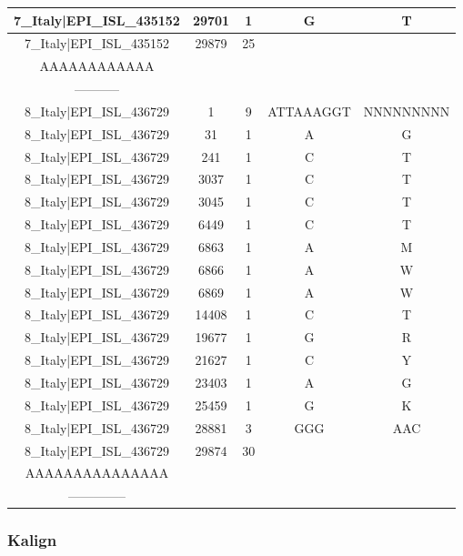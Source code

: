 \documentclass[a4paper,10pt]{article}
\begin{document}
\begin{longtable}{@{}ccccc@{}}
7\_Italy|EPI\_ISL\_435152 & 29701 & 1 & G & T \\* \midrule
7\_Italy|EPI\_ISL\_435152 & 29879 & 25 & \begin{tabular}[c]{@{}c@{}}AAAAAAAAAAAAA\\ AAAAAAAAAAAA\end{tabular} & \begin{tabular}[c]{@{}c@{}}--------------\\ -----------\end{tabular} \\* \midrule
8\_Italy|EPI\_ISL\_436729 & 1 & 9 & ATTAAAGGT & NNNNNNNNN \\* \midrule
8\_Italy|EPI\_ISL\_436729 & 31 & 1 & A & G \\* \midrule
8\_Italy|EPI\_ISL\_436729 & 241 & 1 & C & T \\* \midrule
8\_Italy|EPI\_ISL\_436729 & 3037 & 1 & C & T \\* \midrule
8\_Italy|EPI\_ISL\_436729 & 3045 & 1 & C & T \\* \midrule
8\_Italy|EPI\_ISL\_436729 & 6449 & 1 & C & T \\* \midrule
8\_Italy|EPI\_ISL\_436729 & 6863 & 1 & A & M \\* \midrule
8\_Italy|EPI\_ISL\_436729 & 6866 & 1 & A & W \\* \midrule
8\_Italy|EPI\_ISL\_436729 & 6869 & 1 & A & W \\* \midrule
8\_Italy|EPI\_ISL\_436729 & 14408 & 1 & C & T \\* \midrule
8\_Italy|EPI\_ISL\_436729 & 19677 & 1 & G & R \\* \midrule
8\_Italy|EPI\_ISL\_436729 & 21627 & 1 & C & Y \\* \midrule
8\_Italy|EPI\_ISL\_436729 & 23403 & 1 & A & G \\* \midrule
8\_Italy|EPI\_ISL\_436729 & 25459 & 1 & G & K \\* \midrule
8\_Italy|EPI\_ISL\_436729 & 28881 & 3 & GGG & AAC \\* \midrule
8\_Italy|EPI\_ISL\_436729 & 29874 & 30 & \begin{tabular}[c]{@{}c@{}}AAAAAAAAAAAAAAA\\ AAAAAAAAAAAAAAA\end{tabular} & \begin{tabular}[c]{@{}c@{}}----------------\\ --------------\end{tabular} \\* \bottomrule
\end{longtable}

\newpage
\subsubsection*{Kalign}



\restoregeometry
\end{document}
